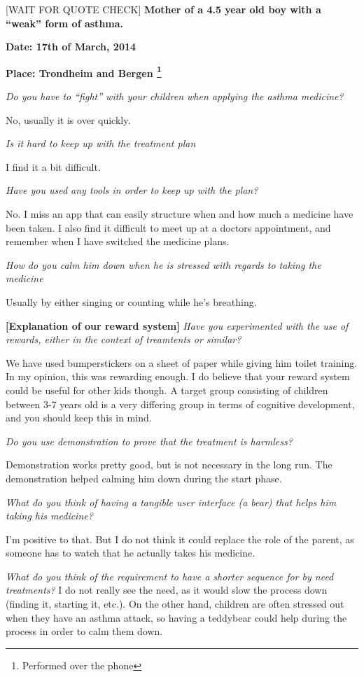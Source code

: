 [WAIT FOR QUOTE CHECK]
\textbf{Mother of a 4.5 year old boy with a ``weak'' form of asthma.}

\textbf{Date: 17th of March, 2014}

\textbf{Place: Trondheim and Bergen \footnote{Performed over the phone}} 

\emph{Do you have to ``fight'' with your children when applying the asthma medicine?}

No, usually it is over quickly.

\emph{Is it hard to keep up with the treatment plan}

I find it a bit difficult. 

\emph{Have you used any tools in order to keep up with the plan?}

No. I miss an app that can easily structure when and how much a medicine have been taken. 
I also find it difficult to meet up at a doctors appointment, and remember when I have switched the medicine plans. 

\emph{How do you calm him down when he is stressed with regards to taking the medicine}

Usually by either singing or counting while he's breathing. 

\textbf{[Explanation of our reward system]}
\emph{Have you experimented with the use of rewards, either in the context of treamtents or similar?}

We have used bumperstickers on a sheet of paper while giving him toilet training. In my opinion, this was rewarding enough. I do believe that your reward system could be useful for other kids though. A target group consisting of children between 3-7 years old is a very differing group in terms of cognitive development, and you should keep this in mind.  

\emph{Do you use demonstration to prove that the treatment is harmless?}

Demonstration works pretty good, but is not necessary in the long run. The demonstration helped calming him down during the start phase. 

\emph{What do you think of having a tangible user interface (a bear) that helps him taking his medicine?}

I'm positive to that. But I do not think it could replace the role of the parent, as someone has to watch that he actually takes his medicine. 

\emph{What do you think of the requirement to have a shorter sequence for by need treatments? }
I do not really see the need, as it would slow the process down (finding it, starting it, etc.). On the other hand, children are often stressed out when they have an asthma attack, so having a teddybear could help during the process in order to calm them down. 

